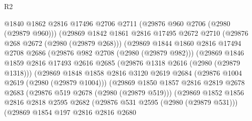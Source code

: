 \begin{lexlean}{R2}
\begin{coremodule}
                          @1840
                          @1862
                          @2816
                          @17496
                          @2706
                          @2711
                          (@29876 @960 @2706 (@2980 (@29879 @960)))
                          (@29869
                            @1842
                            @1861
                            @2816
                            @17495
                            @2672
                            @2710
                            (@29876 @268 @2672 (@2980 (@29879 @268)))
                            (@29869
                              @1844
                              @1860
                              @2816
                              @17494
                              @2708
                              @2686
                              (@29876 @982 @2708 (@2980 (@29879 @982)))
                              (@29869
                                @1846
                                @1859
                                @2816
                                @17493
                                @2616
                                @2685
                                (@29876 @1318 @2616 (@2980 (@29879 @1318)))
                                (@29869
                                  @1848
                                  @1858
                                  @2816
                                  @3120
                                  @2619
                                  @2684
                                  (@29876 @1004 @2619 (@2980 (@29879 @1004)))
                                  (@29869
                                    @1850
                                    @1857
                                    @2816
                                    @2819
                                    @2678
                                    @2683
                                    (@29876 @519 @2678 (@2980 (@29879 @519)))
                                    (@29869
                                      @1852
                                      @1856
                                      @2816
                                      @2818
                                      @2595
                                      @2682
                                      (@29876 @531 @2595 (@2980 (@29879 @531)))
                                      (@29869
                                        @1854
                                        @197
                                        @2816
                                        @2816
                                        @2680

\end{coremodule}
\end{lexlean}
